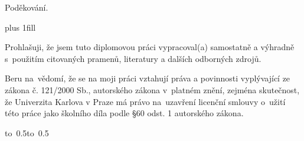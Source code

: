 \documentclass[12pt,a4paper]{report}
\let\openright=\clearpage
\begin{document}
\newpage



\openright

\noindent
Poděkování.

\newpage


\vglue 0pt plus 1fill

\noindent
Prohlašuji, že jsem tuto diplomovou práci vypracoval(a) samostatně a výhradně
s~použitím citovaných pramenů, literatury a dalších odborných zdrojů.

\medskip\noindent
Beru na~vědomí, že se na moji práci vztahují práva a povinnosti vyplývající
ze zákona č. 121/2000 Sb., autorského zákona v~platném znění, zejména skutečnost,
že Univerzita Karlova v Praze má právo na~uzavření licenční smlouvy o~užití této
práce jako školního díla podle §60 odst. 1 autorského zákona.

\vspace{10mm}

\hbox{\hbox to 0.5\hbox to 0.5}

\vspace{20mm}
\newpage

\end{document}
